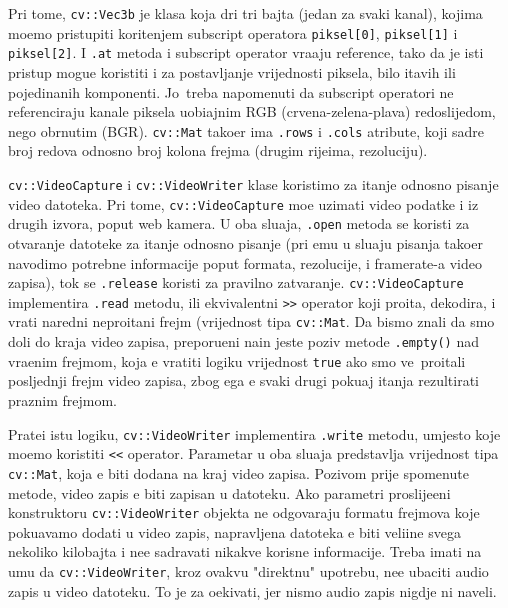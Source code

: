 Pri tome, \lstinline{cv::Vec3b} je klasa koja dr\zh i tri bajta (jedan za svaki kanal), kojima mo\zh emo pristupiti kori\sh tenjem subscript operatora \lstinline{piksel[0]}, \lstinline{piksel[1]} i \lstinline{piksel[2]}. 
I \lstinline{.at} metoda i subscript operator vra\cj aju reference, tako da je isti pristup mogu\cj e koristiti i za postavljanje vrijednosti piksela, bilo \ch itavih ili pojedina\ch nih komponenti. 
Jo\sh\ treba napomenuti da subscript operatori ne referenciraju kanale piksela uobi\ch ajnim RGB (crvena-zelena-plava) redoslijedom, nego obrnutim (BGR). \lstinline{cv::Mat} tako\dj er ima \lstinline{.rows} i 
\lstinline{.cols} atribute, koji sadr\zh e broj redova odnosno broj kolona frejma (drugim rije\ch ima, rezoluciju).

\lstinline{cv::VideoCapture} i \lstinline{cv::VideoWriter} klase koristimo za \ch itanje odnosno pisanje video datoteka. Pri tome, \lstinline{cv::VideoCapture} mo\zh e uzimati video podatke i iz drugih izvora,
poput web kamera. U oba slu\ch aja, \lstinline{.open} metoda se koristi za otvaranje datoteke za \ch itanje odnosno pisanje (pri \ch emu u slu\ch aju pisanja tako\dj er navodimo potrebne informacije poput
formata, rezolucije, i framerate-a video zapisa), tok se \lstinline{.release} koristi za pravilno zatvaranje. \lstinline{cv::VideoCapture} implementira \lstinline{.read} metodu, ili ekvivalentni \lstinline{>>} operator koji
pro\ch ita, dekodira, i vrati naredni nepro\ch itani frejm (vrijednost tipa \lstinline{cv::Mat}. Da bismo znali da smo do\sh li do kraja video zapisa, preporu\ch eni na\ch in jeste poziv metode \lstinline{.empty()} 
nad vra\cj enim frejmom, koja \cj e vratiti logi\ch ku vrijednost \lstinline{true} ako smo ve\cj\ pro\ch itali posljednji frejm video zapisa, zbog \ch ega \cj e svaki drugi poku\sh aj \ch itanja rezultirati praznim frejmom.

Prate\cj i istu logiku, \lstinline{cv::VideoWriter} implementira \lstinline{.write} metodu, umjesto koje mo\zh emo koristiti \lstinline{<<} operator. Parametar u oba slu\ch aja predstavlja vrijednost tipa
\lstinline{cv::Mat}, koja \cj e biti dodana na kraj video zapisa. Pozivom prije spomenute metode, video zapis \cj e biti zapisan u datoteku. Ako parametri proslije\dj eni konstruktoru \lstinline{cv::VideoWriter}
objekta ne odgovaraju formatu frejmova koje poku\sh avamo dodati u video zapis, napravljena datoteka \cj e biti veli\ch ine svega nekoliko kilobajta i ne\cj e sadr\zh avati nikakve korisne informacije.
Treba imati na umu da \lstinline{cv::VideoWriter}, kroz ovakvu "direktnu" upotrebu, ne\cj e ubaciti audio zapis u video datoteku. To je za o\ch ekivati, jer nismo audio zapis nigdje ni naveli.

